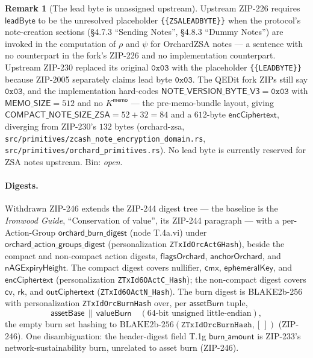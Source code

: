 \documentclass[11pt,a4paper]{article}
\theoremstyle{definition}
\newtheorem{remark}[theorem]{Remark}
\newcommand{\cmx}{\mathsf{cmx}}
\newcommand{\cvsym}{\mathsf{cv}}
\newcommand{\rk}{\mathsf{rk}}
\begin{document}
\begin{remark}[The lead byte is unassigned upstream]\label{rem:zsa-leadbyte}
Upstream ZIP-226 requires $\mathsf{leadByte}$ to be the unresolved
placeholder \texttt{\{\{ZSALEADBYTE\}\}} when the protocol's note-creation
sections (\S4.7.3 ``Sending Notes'', \S4.8.3 ``Dummy Notes'') are invoked
in the computation of $\rho$ and $\psi$ for OrchardZSA notes --- a
sentence with no counterpart
in the fork's ZIP-226 and no implementation counterpart. Upstream ZIP-230
replaced its original $\mathtt{0x03}$ with the placeholder
\texttt{\{\{LEADBYTE\}\}} because ZIP-2005 separately claims lead byte
$\mathtt{0x03}$. The QEDit fork ZIPs still say $\mathtt{0x03}$, and the
implementation hard-codes $\mathsf{NOTE\_VERSION\_BYTE\_V3} = \mathtt{0x03}$
with $\mathsf{MEMO\_SIZE} = 512$ and no $K^{\mathsf{memo}}$ --- the
pre-memo-bundle layout, giving $\mathsf{COMPACT\_NOTE\_SIZE\_ZSA} = 52 + 32
= 84$ and a $612$-byte $\mathsf{encCiphertext}$, diverging from ZIP-230's
$132$ bytes (\textsf{orchard-zsa},
\texttt{src/primitives/zcash\_note\_encryption\_domain.rs},
\texttt{src/primitives/orchard\_primitives.rs}). No lead byte is currently
reserved for ZSA notes upstream. Bin: \emph{open}.
\end{remark}

\paragraph{Digests.} Withdrawn ZIP-246 extends the ZIP-244 digest tree ---
the baseline is the \emph{Ironwood Guide}, ``Conservation of value'', its
ZIP-244 paragraph --- with a per-Action-Group
$\mathsf{orchard\_burn\_digest}$ (node T.4a.vi) under
$\mathsf{orchard\_action\_groups\_digest}$ (personalization
\texttt{ZTxIdOrcActGHash}), beside the compact and non-compact action
digests, $\mathsf{flagsOrchard}$, $\mathsf{anchorOrchard}$, and
$\mathsf{nAGExpiryHeight}$. The compact digest covers nullifier, $\cmx$,
$\mathsf{ephemeralKey}$, and $\mathsf{encCiphertext}$ (personalization
\texttt{ZTxId6OActC\_Hash}); the non-compact digest covers $\cvsym$, $\rk$,
and $\mathsf{outCiphertext}$ (\texttt{ZTxId6OActN\_Hash}). The burn digest
is BLAKE2b-256 with personalization \texttt{ZTxIdOrcBurnHash} over, per
$\mathsf{assetBurn}$ tuple,
\[
\mathsf{assetBase} \,\|\, \mathsf{valueBurn} \quad
(\text{$64$-bit unsigned little-endian}),
\]
the empty burn set hashing to
$\mathrm{BLAKE2b\text{-}256}(\texttt{ZTxIdOrcBurnHash}, [\,])$ (ZIP-246).
One disambiguation: the header-digest field T.1g $\mathsf{burn\_amount}$ is
ZIP-233's network-sustainability burn, unrelated to asset burn (ZIP-246).
\end{document}
